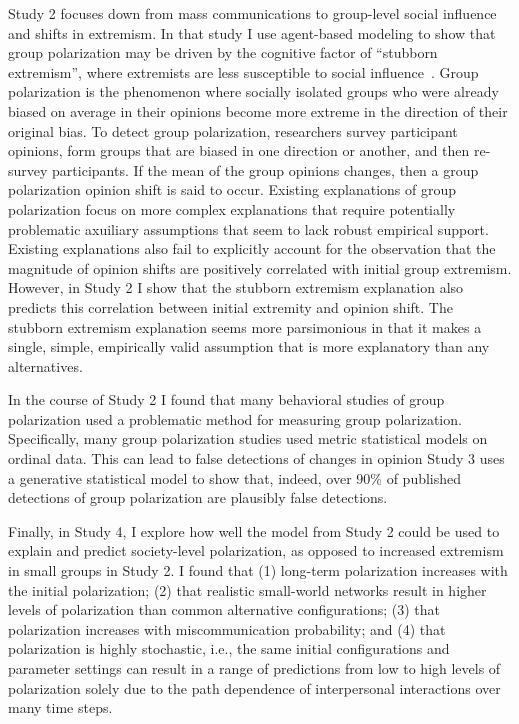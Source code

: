 \documentclass[12pt,letterpaper]{article}
\begin{document}
Study 2 focuses down from
mass communications to group-level social influence and shifts in extremism.
In that study I use agent-based modeling to show that group polarization 
may be driven by the cognitive factor of ``stubborn extremism'', where
extremists are less susceptible to social influence~\cite{Reiss2019,Zmigrod2019a}.
Group polarization is the phenomenon where socially isolated groups who were
already biased on average in their opinions become more extreme in the direction
of their original bias. To detect group polarization, researchers survey participant
opinions, form groups that are biased in one direction or another, and then
re-survey participants. If the mean of the group opinions changes, then
a group polarization opinion shift is said to occur. Existing explanations of
group polarization focus on more complex explanations that require potentially
problematic axuiliary assumptions that seem to lack robust empirical support.
Existing explanations also fail to explicitly account for the observation that
the magnitude of opinion shifts are positively correlated with initial group
extremism. However, in Study 2 I show that the stubborn extremism explanation
also predicts this correlation between initial extremity and opinion shift.
The stubborn extremism explanation seems more parsimonious in that
it makes a single, simple, empirically valid assumption that is more explanatory
than any alternatives.

In the course of Study 2 I found that many behavioral studies of
group polarization used a problematic method for measuring group polarization.
Specifically, many group polarization studies used metric statistical models
on ordinal data. This can lead to false detections of changes in opinion
Study 3 uses a generative statistical model to show that, indeed, over 90\% of 
published detections of group polarization are plausibly false detections. 

Finally, in Study 4, I explore how well the
model from Study 2 could be used to explain and predict society-level
polarization, as opposed to increased extremism in small groups in Study 2.
I found that (1) long-term polarization increases with the initial
polarization; (2) that realistic small-world networks result in higher levels of
polarization than common alternative configurations; (3) that polarization
increases with miscommunication probability; and (4) that
polarization is highly stochastic, i.e., the same initial configurations and
parameter settings can result in a range of predictions from low to high
levels of polarization solely due to the path dependence of interpersonal
interactions over many time steps.




\setlength{\bibleftmargin}{.125in}
\setlength{\bibindent}{-\bibleftmargin}


\end{document}

